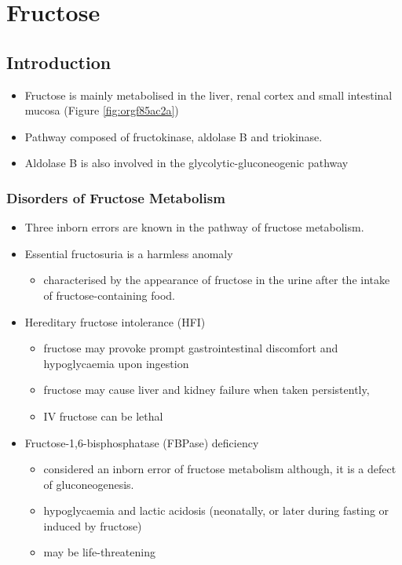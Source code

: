 \documentclass{scrartcl}
\begin{document}
\section{Fructose}
\label{sec:org157787e}
\subsection{Introduction}
\label{sec:orgd6df07c}
\begin{itemize}
\item Fructose is mainly metabolised in the liver, renal cortex and small
intestinal mucosa (Figure \ref{fig:orgf85ac2a})
\item Pathway composed of fructokinase, aldolase B and triokinase.
\item Aldolase B is also involved in the glycolytic-gluconeogenic pathway
\end{itemize}

\subsubsection{Disorders of Fructose Metabolism}
\label{sec:orgff3fd48}
\begin{itemize}
\item Three inborn errors are known in the pathway of fructose metabolism.
\item Essential fructosuria is a harmless anomaly
\begin{itemize}
\item characterised by the appearance of fructose in the urine after the intake of fructose-containing food.
\end{itemize}
\item Hereditary fructose intolerance (HFI)
\begin{itemize}
\item fructose may provoke prompt gastrointestinal discomfort and hypoglycaemia upon ingestion
\item fructose may cause liver and kidney failure when taken persistently,
\item IV fructose can be lethal
\end{itemize}
\item Fructose-1,6-bisphosphatase (FBPase) deficiency
\begin{itemize}
\item considered an inborn error of fructose metabolism although, it is a defect of gluconeogenesis.
\item hypoglycaemia and lactic acidosis (neonatally, or later during fasting or induced by fructose)
\item may be life-threatening
\end{itemize}
\end{itemize}
\end{document}
